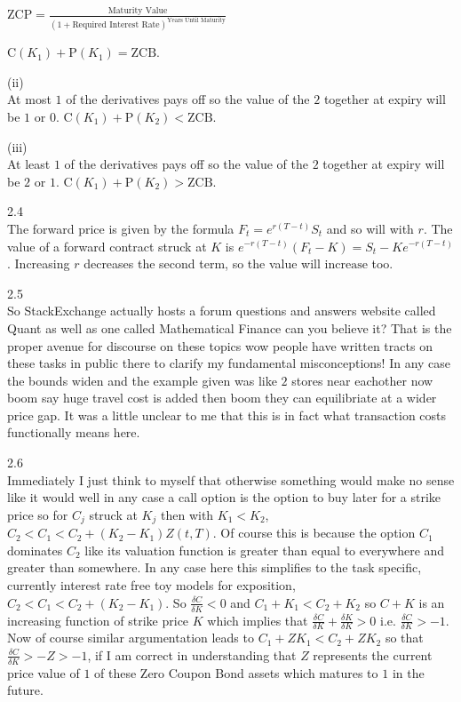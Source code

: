 $\text{ZCP}=\frac{\text{Maturity Value}}{(1+\text{Required Interest Rate})^{\text{Years Until Maturity}}}$

$\boxed{\text{C}(K_1)+\text{P}(K_1) = \text{ZCB}}$.

(ii) \\
At most $1$ of the derivatives pays off so the value of the $2$ together at expiry will be $1$ or $0$. $\boxed{\text{C}(K_1)+\text{P}(K_2) < \text{ZCB}}$.

(iii) \\
At least $1$ of the derivatives pays off so the value of the $2$ together at expiry will be $2$ or $1$. $\boxed{\text{C}(K_1)+\text{P}(K_2) > \text{ZCB}}$.

2.4 \\
The forward price is given by the formula $F_t=e^{r(T-t)} S_t$ and so will  with $r$. The value of a forward contract struck at $K$ is $e^{-r(T-t)}(F_t-K) = S_t - K e^{-r (T-t)}$. Increasing $r$ decreases the second term, so the value will $\boxed{\text{increase}}$ too.

2.5 \\
So StackExchange actually hosts a forum questions and answers website called Quant as well as one called Mathematical Finance can you believe it? That is the proper avenue for discourse on these topics wow people have written tracts on these tasks in public there to clarify my fundamental misconceptions! In any case the bounds $\boxed{\text{widen}}$ and the example given was like $2$ stores near eachother now boom say huge travel cost is added then boom they can equilibriate at a wider price gap. It was a little unclear to me that this is in fact what transaction costs functionally means here.

2.6 \\
Immediately I just think to myself that otherwise something would make no sense like it would well in any case a call option is the option to buy later for a strike price so for $C_j$ struck at $K_j$ then with $K_1 < K_2$, $C_2 < C_1 < C_2 + (K_2 - K_1) Z(t,T)$. Of course this is because the option $C_1$ dominates $C_2$ like its valuation function is greater than equal to everywhere and greater than somewhere. In any case here this simplifies to the task specific, currently interest rate free toy models for exposition, $C_2 < C_1 < C_2 + (K_2 -  K_1)$. So $\frac{\delta C}{\delta K} < 0$ and $C_1 + K_1 < C_2 + K_2$ so $C+K$ is an increasing function of strike price $K$ which implies that $\frac{\delta C}{\delta K}+\frac{\delta K}{\delta K} > 0$ i.e. $\frac{\delta C}{\delta K} > -1$. Now of course similar argumentation leads to $C_1 + ZK_1 < C_2 + ZK_2$ so that $\frac{\delta C}{\delta K} > -Z > -1$, if I am correct in understanding that $Z$ represents the current price value of $1$ of these Zero Coupon Bond assets which matures to $1$ in the future.

